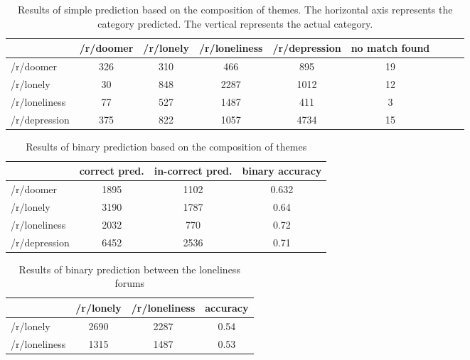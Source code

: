 \documentclass[../report.tex]{subfiles}
\begin{document}
\begin{table*}[ht]
    \centering
   \begin{tabular}{| l | c | c |c | c | c | c | c | c |}
    \toprule
    {} & /r/doomer & /r/lonely & /r/loneliness & /r/depression & no match found \\ 
    \midrule
 /r/doomer & 326 & 310 & 466 & 895 & 19 \\ 
 /r/lonely & 30 & 848 & 2287 & 1012 & 12 \\ 
/r/loneliness & 77 & 527 & 1487 & 411 & 3 \\
/r/depression & 375 & 822 & 1057 & 4734 & 15 \\

    \bottomrule
   \end{tabular} 

   \caption{Results of simple prediction based on the composition of themes. The horizontal axis represents the category predicted. The vertical represents the actual category.}
   \label{tab:pred_results}
\end{table*}

\begin{table}[H]
    \centering
   \begin{tabular}{| l | c | c |c |}
    \toprule
    {} & \multicolumn{1}{p{1cm}|}{correct pred.} & \multicolumn{1}{p{1cm}|}{in-correct pred.} & \multicolumn{1}{p{1cm}|}{binary accuracy} \\
    \midrule
 /r/doomer & 1895 & 1102 & 0.632\\ 
 /r/lonely & 3190 & 1787 & 0.64\\ 
/r/loneliness & 2032 & 770 & 0.72\\
/r/depression & 6452 & 2536 & 0.71 \\
    \bottomrule
   \end{tabular}

   \caption{Results of binary prediction based on the composition of themes}
   \label{tab:binary_pred_results}
\end{table}


\begin{table}[H]
    \centering
   \begin{tabular}{| l | c | c |c |}
    \toprule
    {} & /r/lonely & /r/loneliness & accuracy \\ 
    \midrule
/r/lonely & 2690 & 2287 & 0.54 \\
/r/loneliness & 1315 & 1487 & 0.53 \\
    \bottomrule
   \end{tabular}

   \caption{Results of binary prediction between the loneliness forums}
   \label{tab:loneliness_pred_results}
\end{table}
\end{document}
